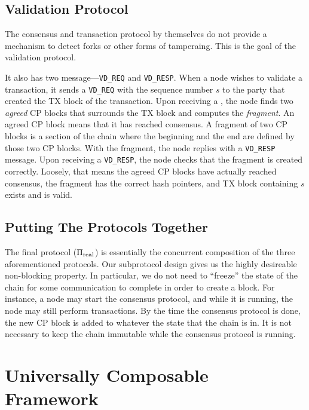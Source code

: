 \subsection{Validation Protocol}
The consensus and transaction protocol by themselves do not provide a mechanism to detect forks or other forms of tamperaing.
This is the goal of the validation protocol.

It also has two message---\texttt{VD\_REQ} and \texttt{VD\_RESP}.
When a node wishes to validate a transaction,
it sends a \texttt{VD\_REQ} with the sequence number $s$ to the party that created the TX block of the transaction.
Upon receiving a , the node finds two \emph{agreed} CP blocks that surrounds the TX block and computes the \emph{fragment}.
An agreed CP block means that it has reached consensus.
A fragment of two CP blocks is a section of the chain where the beginning and the end are defined by those two CP blocks.
With the fragment, the node replies with a \texttt{VD\_RESP} message.
Upon receiving a \texttt{VD\_RESP}, the node checks that the fragment is created correctly.
Loosely, that means the agreed CP blocks have actually reached consensus,
the fragment has the correct hash pointers,
and TX block containing $s$ exists and is valid.


\subsection{Putting The Protocols Together}
The final protocol ($\Pi_{\text{real}}$) is essentially the concurrent composition of the three aforementioned protocols.
Our subprotocol design gives us the highly desireable non-blocking property.
In particular, we do not need to ``freeze'' the state of the chain for some communication to complete in order to create a block.
For instance, a node may start the consensus protocol, and while it is running, the node may still perform transactions.
By the time the consensus protocol is done, the new CP block is added to whatever the state that the chain is in.
It is not necessary to keep the chain immutable while the consensus protocol is running.

\section{Universally Composable Framework}
\label{sec:uc-intro}

